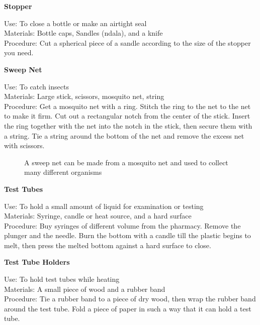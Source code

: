 \begin{flushleft}
\textbf{Stopper}
\end{flushleft}
\vspace{-10pt}
Use: To close a bottle or make an airtight seal\\
Materials: Bottle caps, Sandles (ndala), and a knife\\
Procedure: Cut a spherical piece of a sandle according to the size of the stopper you need.\\

\begin{flushleft}
\textbf{Sweep Net}
\end{flushleft}
\vspace{-10pt}
Use: To catch insects\\
Materials: Large stick, scissors, mosquito net, string\\
Procedure: Get a mosquito net with a ring. Stitch the ring to the net to the net to make it firm. Cut out a rectangular notch from the center of the stick. Insert the ring together with the net
into the notch in the stick, then secure them with a string.  Tie a string around the bottom of the net and remove the excess net with scissors. \\

\begin{figure}[h]
\begin{center}
\def\svgwidth{9cm}

\caption{A sweep net can be made from a mosquito net and used to collect many different organisms}
\label{fig:butterfly-net}
\end{center}
\end{figure}


\begin{flushleft}
\textbf{Test Tubes}
\end{flushleft}
\vspace{-10pt}
Use: To hold a small amount of liquid for examination or testing\\
Materials: Syringe, candle or heat source, and a hard surface\\
Procedure: Buy syringes of different volume from the pharmacy. Remove the plunger and the needle. Burn the bottom with a candle till the plastic begins to melt, then press the melted bottom against a hard surface to close.\\

\begin{flushleft}
\textbf{Test Tube Holders}
\end{flushleft}
\vspace{-10pt}
Use: To hold test tubes while heating\\
Materials: A small piece of wood and a rubber band\\
Procedure: Tie a rubber band to a piece of dry wood, then wrap the rubber band around the test tube. Fold a piece of paper in such a way that it can hold a test tube.\\

